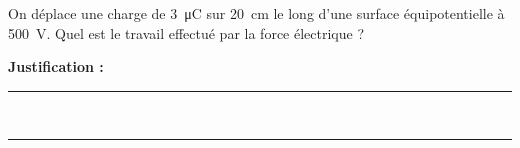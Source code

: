 On déplace une charge de \qty{3}{\micro\coulomb} sur \qty{20}{cm} le long d'une surface équipotentielle à \qty{500}{V}. Quel est le travail effectué par la force électrique ?

\choices

\noindent\textbf{Justification :} \hrulefill \\[2.5ex]
\rule{\linewidth}{0.4pt} \\[2.5ex]
\rule{\linewidth}{0.4pt}
\vfill
